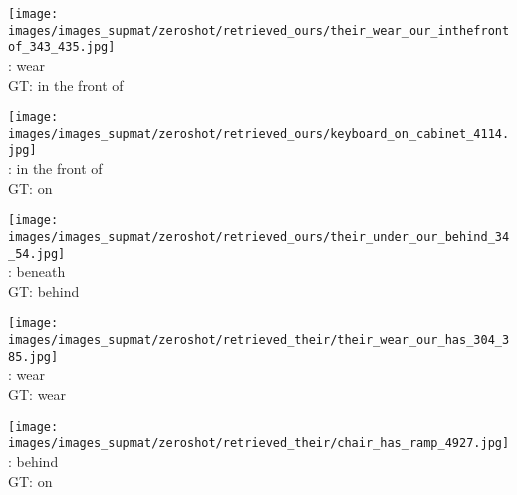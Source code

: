 \documentclass[10pt,twocolumn,letterpaper]{article}
\begin{document}
\begin{figure*}[t]
\begin{minipage}[t]{0.185\textwidth}
    	\centering
       	\texttt{[image: images/images\_supmat/zeroshot/retrieved\_ours/their\_wear\_our\_inthefrontof\_343\_435.jpg]}\\
		\vspace{0.3ex}       	
       	\cite{Lu16}: wear \\
       	GT: in the front of
       	\vspace{3ex}
    \end{minipage}
    \hspace{0.005\textwidth}
\begin{minipage}[t]{0.185\textwidth}
    	\centering
       	\texttt{[image: images/images\_supmat/zeroshot/retrieved\_ours/keyboard\_on\_cabinet\_4114.jpg]}\\
       	\vspace{0.3ex}
       	\cite{Lu16}: in the front of \\
       	GT: on
       	\vspace{0.2ex}
    \end{minipage}
    \hspace{0.005\textwidth}
\begin{minipage}[t]{0.185\textwidth}
       \centering
       \texttt{[image: images/images\_supmat/zeroshot/retrieved\_ours/their\_under\_our\_behind\_34\_54.jpg]}\\
       \vspace{0.3ex}
       \cite{Lu16}: beneath \\
       GT: behind
       \vspace{0.2ex}
    \end{minipage}
    \hspace{0.005\textwidth}
\begin{minipage}[t]{0.185\textwidth}
    	\centering
       	\texttt{[image: images/images\_supmat/zeroshot/retrieved\_their/their\_wear\_our\_has\_304\_385.jpg]}\\
       	\vspace{0.3ex}
       	\cite{Lu16}: wear \\
       	GT: wear
       	\vspace{0.2ex}
    \end{minipage}
    \hspace{0.005\textwidth}  
\begin{minipage}[t]{0.185\textwidth}
    	\centering
       	\texttt{[image: images/images\_supmat/zeroshot/retrieved\_their/chair\_has\_ramp\_4927.jpg]}\\
       	\vspace{0.3ex}
       	\cite{Lu16}: behind \\
       	GT: on
      	\vspace{0.2ex}
    \end{minipage} 
    

\end{figure*}
\end{document}
